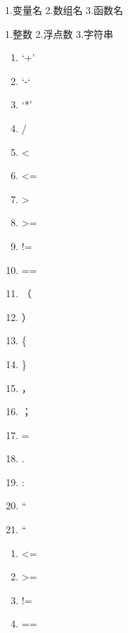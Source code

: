 \documentclass[letterpaper,10pt,english]{sphinxmanual}
\begin{document}

1.变量名
2.数组名
3.函数名


1.整数
2.浮点数
3.字符串

\begin{enumerate}
\item {} 
‘+’

\item {} 
‘-‘

\item {} 
‘*’

\item {} 
/

\item {} 
\textless{}

\item {} 
\textless{}=

\item {} 
\textgreater{}

\item {} 
\textgreater{}=

\item {} 
!=

\item {} 
==

\item {} 
（

\item {} 
）

\item {} 
\{

\item {} 
\}

\item {} 
，

\item {} 
；

\item {} 
=

\item {} 
.

\item {} 
:

\item {} 
“

\item {} 
“

\end{enumerate}

\begin{enumerate}
\item {} 
\textless{}=

\item {} 
\textgreater{}=

\item {} 
!=

\item {} 
==

\end{enumerate}
\end{document}
